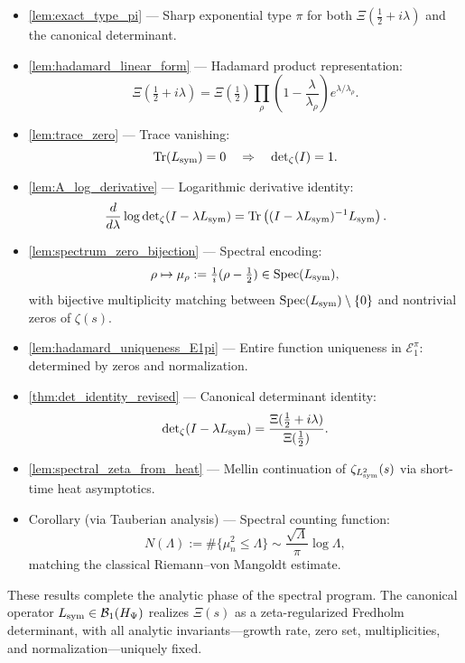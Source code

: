 \begin{itemize}
  \item \cref{lem:exact_type_pi} — Sharp exponential type \( \pi \) for both \( \Xi(\tfrac{1}{2} + i\lambda) \) and the canonical determinant.

  \item \cref{lem:hadamard_linear_form} — Hadamard product representation:
  \[
  \Xi\left( \tfrac{1}{2} + i\lambda \right) = \Xi\left( \tfrac{1}{2} \right) \prod_{\rho} \left(1 - \frac{\lambda}{\lambda_\rho}\right) e^{\lambda/\lambda_\rho}.
  \]

  \item \cref{lem:trace_zero} — Trace vanishing:
  \[
  \operatorname{Tr}(L_{\mathrm{sym}}) = 0 \quad \Rightarrow \quad \det\nolimits_{\zeta}(I) = 1.
  \]

  \item \cref{lem:A_log_derivative} — Logarithmic derivative identity:
  \[
  \frac{d}{d\lambda} \log \det\nolimits_{\zeta}(I - \lambda L_{\mathrm{sym}}) = \operatorname{Tr}\left( (I - \lambda L_{\mathrm{sym}})^{-1} L_{\mathrm{sym}} \right).
  \]

  \item \cref{lem:spectrum_zero_bijection} — Spectral encoding:
  \[
  \rho \mapsto \mu_\rho := \tfrac{1}{i}(\rho - \tfrac{1}{2}) \in \operatorname{Spec}(L_{\mathrm{sym}}),
  \]
  with bijective multiplicity matching between \( \operatorname{Spec}(L_{\mathrm{sym}}) \setminus \{0\} \) and nontrivial zeros of \( \zeta(s) \).

  \item \cref{lem:hadamard_uniqueness_E1pi} — Entire function uniqueness in \( \mathcal{E}_1^\pi \): determined by zeros and normalization.

  \item \cref{thm:det_identity_revised} — Canonical determinant identity:
  \[
  \det\nolimits_{\zeta}(I - \lambda L_{\mathrm{sym}}) = \frac{\Xi(\tfrac{1}{2} + i\lambda)}{\Xi(\tfrac{1}{2})}.
  \]

  \item \cref{lem:spectral_zeta_from_heat} — Mellin continuation of \( \zeta_{L_{\mathrm{sym}}^2}(s) \) via short-time heat asymptotics.

  \item Corollary (via Tauberian analysis) — Spectral counting function:
  \[
  N(\Lambda) := \#\{ \mu_n^2 \le \Lambda \} \sim \frac{\sqrt{\Lambda}}{\pi} \log \Lambda,
  \]
  matching the classical Riemann--von Mangoldt estimate.
\end{itemize}

\medskip

\noindent
These results complete the analytic phase of the spectral program. The canonical operator \( L_{\mathrm{sym}} \in \mathcal{B}_1(H_{\Psi}) \) realizes \( \Xi(s) \) as a zeta-regularized Fredholm determinant, with all analytic invariants—growth rate, zero set, multiplicities, and normalization—uniquely fixed.

